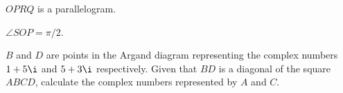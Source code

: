\begin{solution}
\begin{ppart}
\begin{center}
        \end{center}
    \end{ppart}
    \begin{ppart}
        $OPRQ$ is a parallelogram.
    \end{ppart}
    \begin{ppart}
        $\angle SOP = \pi/2$.
    \end{ppart}
\end{solution}

\begin{problem}
    $B$ and $D$ are points in the Argand diagram representing the complex numbers $1 + 5\i$ and $5 + 3\i$ respectively. Given that $BD$ is a diagonal of the square $ABCD$, calculate the complex numbers represented by $A$ and $C$.
\end{problem}
